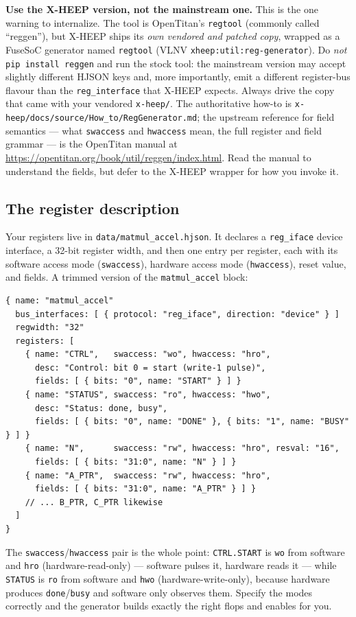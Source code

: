 \documentclass[11pt]{article}
\newcommand{\code}[1]{\texttt{#1}}
\begin{document}
\medskip
\noindent\textbf{Use the X-HEEP version, not the mainstream one.} This is the one
warning to internalize. The tool is OpenTitan's \code{regtool} (commonly called
``reggen''), but X-HEEP ships its \emph{own vendored and patched copy}, wrapped
as a FuseSoC generator named \code{regtool} (VLNV
\code{xheep:util:reg-generator}). Do \emph{not} \code{pip install reggen} and run
the stock tool: the mainstream version may accept slightly different HJSON keys
and, more importantly, emit a different register-bus flavour than the
\code{reg\_interface} that X-HEEP expects. Always drive the copy that came with
your vendored \code{x-heep/}. The authoritative how-to is
\code{x-heep/docs/source/How\_to/RegGenerator.md}; the upstream reference for
field semantics --- what \code{swaccess} and \code{hwaccess} mean, the full
register and field grammar --- is the OpenTitan manual at
\url{https://opentitan.org/book/util/reggen/index.html}. Read the manual to
understand the fields, but defer to the X-HEEP wrapper for how you invoke it.

\subsection{The register description}

Your registers live in \code{data/matmul\_accel.hjson}. It declares a
\code{reg\_iface} device interface, a 32-bit register width, and then one entry
per register, each with its software access mode (\code{swaccess}), hardware
access mode (\code{hwaccess}), reset value, and fields. A trimmed version of the
\code{matmul\_accel} block:

\begin{lstlisting}[style=sh]
{ name: "matmul_accel"
  bus_interfaces: [ { protocol: "reg_iface", direction: "device" } ]
  regwidth: "32"
  registers: [
    { name: "CTRL",   swaccess: "wo", hwaccess: "hro",
      desc: "Control: bit 0 = start (write-1 pulse)",
      fields: [ { bits: "0", name: "START" } ] }
    { name: "STATUS", swaccess: "ro", hwaccess: "hwo",
      desc: "Status: done, busy",
      fields: [ { bits: "0", name: "DONE" }, { bits: "1", name: "BUSY" } ] }
    { name: "N",      swaccess: "rw", hwaccess: "hro", resval: "16",
      fields: [ { bits: "31:0", name: "N" } ] }
    { name: "A_PTR",  swaccess: "rw", hwaccess: "hro",
      fields: [ { bits: "31:0", name: "A_PTR" } ] }
    // ... B_PTR, C_PTR likewise
  ]
}
\end{lstlisting}

The \code{swaccess}/\code{hwaccess} pair is the whole point: \code{CTRL.START} is
\code{wo} from software and \code{hro} (hardware-read-only) --- software pulses
it, hardware reads it --- while \code{STATUS} is \code{ro} from software and
\code{hwo} (hardware-write-only), because hardware produces \code{done}/\code{busy}
and software only observes them. Specify the modes correctly and the generator
builds exactly the right flops and enables for you.
\end{document}
